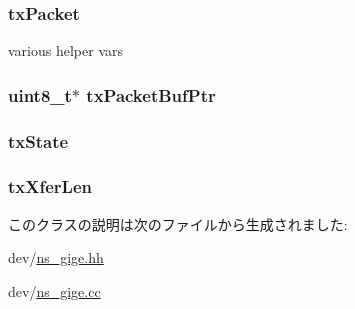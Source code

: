 \label{classNSGigE_acfce4fae6fa03f94e3d91d71302fe349}
\hypertarget{classNSGigE_a8d22e1a154942ff0d4ab9048e7e844bb}{
\subsubsection[{txPacket}]{ {\bf txPacket}}}
\label{classNSGigE_a8d22e1a154942ff0d4ab9048e7e844bb}
various helper vars \hypertarget{classNSGigE_a0481aba8937a430f506612cbe987eb03}{
\subsubsection[{txPacketBufPtr}]{\setlength{\rightskip}{0pt plus 5cm}uint8\_\-t$\ast$ {\bf txPacketBufPtr}}}
\label{classNSGigE_a0481aba8937a430f506612cbe987eb03}
\hypertarget{classNSGigE_a12e3a80bef638cd15c067541b96a4756}{
\subsubsection[{txState}]{ {\bf txState}}}
\label{classNSGigE_a12e3a80bef638cd15c067541b96a4756}
\hypertarget{classNSGigE_a2b5ee5cdd15e5dc9250023f6e0b56810}{
\subsubsection[{txXferLen}]{ {\bf txXferLen}}}
\label{classNSGigE_a2b5ee5cdd15e5dc9250023f6e0b56810}


このクラスの説明は次のファイルから生成されました:\begin{DoxyCompactItemize}
\item 
dev/\hyperlink{ns__gige_8hh}{ns\_\-gige.hh}\item 
dev/\hyperlink{ns__gige_8cc}{ns\_\-gige.cc}\end{DoxyCompactItemize}
